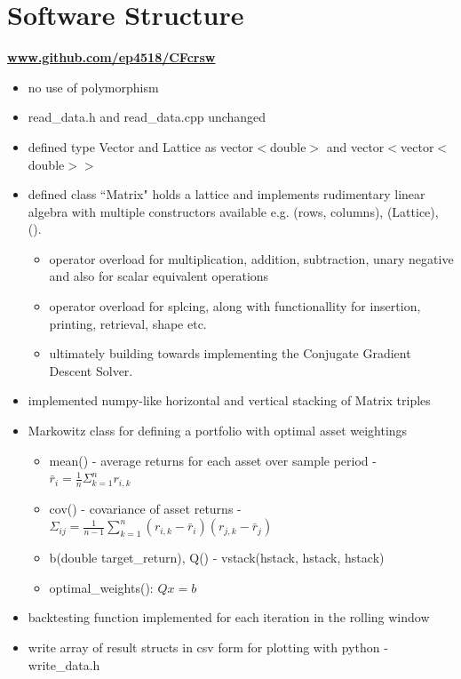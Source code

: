 \documentclass[12pt,twoside]{article}
\begin{document}


\section{Software Structure}
\textbf{\href{https://github.com/ep4518/CFcrsw}{www.github.com/ep4518/CFcrsw}}
\begin{itemize}[nosep]
    \item no use of polymorphism
    \item read\_data.h and read\_data.cpp unchanged
    \item defined type Vector and Lattice as vector$<$double$>$ and vector$<$vector$<$double$>$$>$
    \item defined class ``Matrix" holds a lattice and implements rudimentary linear algebra with multiple constructors available e.g. (rows, columns), (Lattice), ().
    \begin{itemize}[nosep]
        \item operator overload for multiplication, addition, subtraction, unary negative and also for scalar equivalent operations
        \item operator overload for splcing, along with functionallity for insertion, printing, retrieval, shape etc.
        \item ultimately building towards implementing the Conjugate Gradient Descent Solver.
    \end{itemize}
    \item implemented numpy-like horizontal and vertical stacking of Matrix triples
    \item Markowitz class for defining a portfolio with optimal asset weightings
    \begin{itemize}[nosep]
        \item mean() - average returns for each asset over sample period - $\bar{r}_i = \frac{1}{n}\Sigma_{k=1}^n r_{i,k} $
        \item cov() - covariance of asset returns - $\Sigma_{ij} = \frac{1}{n - 1}\sum_{k=1}^n (r_{i,k} - \bar{r}_i)(r_{j,k} - \bar{r}_j)$
        \item b(double target\_return), Q() - vstack(hstack, hstack, hstack)
        \item optimal\_weights(): $Q x = b$
    \end{itemize}
    \item backtesting function implemented for each iteration in the rolling window
    \item write array of result structs in csv form for plotting with python - write\_data.h
\end{itemize}
\end{document}
